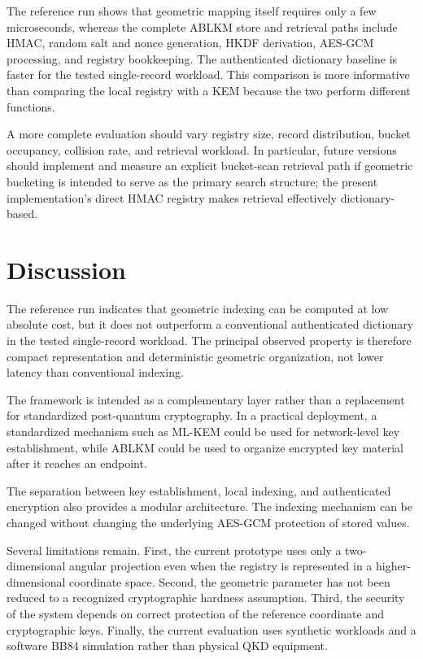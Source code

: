 \documentclass[journal,twocolumn]{IEEEtran}
\begin{document}
The reference run shows that geometric mapping itself requires only a few microseconds, whereas the complete ABLKM store and retrieval paths include HMAC, random salt and nonce generation, HKDF derivation, AES-GCM processing, and registry bookkeeping. The authenticated dictionary baseline is faster for the tested single-record workload. This comparison is more informative than comparing the local registry with a KEM because the two perform different functions.

A more complete evaluation should vary registry size, record distribution, bucket occupancy, collision rate, and retrieval workload. In particular, future versions should implement and measure an explicit bucket-scan retrieval path if geometric bucketing is intended to serve as the primary search structure; the present implementation's direct HMAC registry makes retrieval effectively dictionary-based.

\section{Discussion}

The reference run indicates that geometric indexing can be computed at low absolute cost, but it does not outperform a conventional authenticated dictionary in the tested single-record workload. The principal observed property is therefore compact representation and deterministic geometric organization, not lower latency than conventional indexing.

The framework is intended as a complementary layer rather than a replacement for standardized post-quantum cryptography. In a practical deployment, a standardized mechanism such as ML-KEM could be used for network-level key establishment, while ABLKM could be used to organize encrypted key material after it reaches an endpoint.

The separation between key establishment, local indexing, and authenticated encryption also provides a modular architecture. The indexing mechanism can be changed without changing the underlying AES-GCM protection of stored values.

Several limitations remain. First, the current prototype uses only a two-dimensional angular projection even when the registry is represented in a higher-dimensional coordinate space. Second, the geometric parameter has not been reduced to a recognized cryptographic hardness assumption. Third, the security of the system depends on correct protection of the reference coordinate and cryptographic keys. Finally, the current evaluation uses synthetic workloads and a software BB84 simulation rather than physical QKD equipment.
\end{document}
